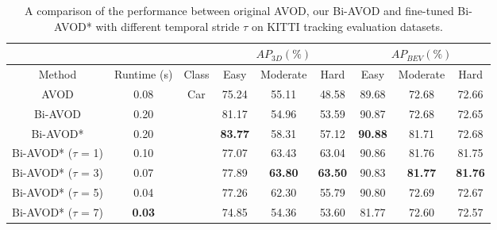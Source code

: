 \documentclass{bmvc2k}
\begin{document}
\begin{table}\centering
	\footnotesize
	\begin{tabular}{ccccccccc}
		&   		   &  											& \multicolumn{3}{c}{$AP_{3D}(\%)$}  		    & \multicolumn{3}{c}{$AP_{BEV}(\%)$} \\ \toprule[1.5pt]
		Method   & Runtime (s) & \multicolumn{1}{c|}{Class}  				& Easy & Moderate & \multicolumn{1}{c|}{Hard}  & Easy   & Moderate     & Hard    \\ \midrule
		AVOD\cite{ku2018joint}     & 0.08        & \multicolumn{1}{c|}{\multirow{7}{*}{Car}}  & 75.24 & 55.11   & \multicolumn{1}{c|}{48.58} & 89.68  & 72.68        & 72.66   \\
		Bi-AVOD  & 0.20        & \multicolumn{1}{c|}{}                      & 81.17 & 54.96   & \multicolumn{1}{c|}{53.59} & 90.87  & 72.68        & 72.65   \\
		Bi-AVOD* & 0.20        & \multicolumn{1}{c|}{}    & \textbf{83.77}  & 58.31  & \multicolumn{1}{c|}{57.12} & \textbf{90.88} & 81.71 & 72.68  \\
		Bi-AVOD* ($\tau$ = 1)  & 0.10  & \multicolumn{1}{c|}{}      & 77.07 & 63.43     & \multicolumn{1}{c|}{63.04} & 90.86    & 81.76        & 81.75     \\
		Bi-AVOD* ($\tau$ = 3)  & 0.07  & \multicolumn{1}{c|}{}      & 77.89 & \textbf{63.80} & \multicolumn{1}{c|}{\textbf{63.50}} & 90.83    & \textbf{81.77}    & \textbf{81.76}  \\
		Bi-AVOD* ($\tau$ = 5)  & 0.04  & \multicolumn{1}{c|}{}      & 77.26 & 62.30     & \multicolumn{1}{c|}{55.79} & 90.80    & 72.69        & 72.67     \\
		Bi-AVOD* ($\tau$ = 7)  & \textbf{0.03} & \multicolumn{1}{c|}{}      & 74.85 & 54.36   & \multicolumn{1}{c|}{53.60} & 81.77    & 72.60        & 72.57 \\
		\bottomrule[1.5pt]
	\end{tabular}
	\setlength{\abovecaptionskip}{1pt}
	\caption{A comparison of the performance between original AVOD, our Bi-AVOD and fine-tuned Bi-AVOD* with different temporal stride $\tau$ on KITTI tracking evaluation datasets.}
	\label{table:result_detection}
	\vspace{-0.2cm}
\end{table}
\end{document}
